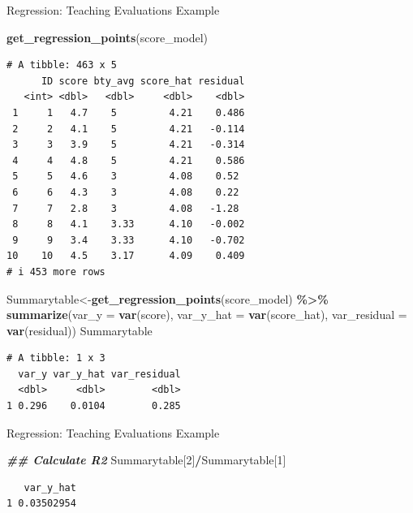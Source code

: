 \documentclass[
  ignorenonframetext,
]{beamer}
\newenvironment{Shaded}{\begin{snugshade}}{\end{snugshade}}
\newcommand{\AttributeTok}[1]{\textcolor[rgb]{0.13,0.29,0.53}{#1}}
\newcommand{\DecValTok}[1]{\textcolor[rgb]{0.00,0.00,0.81}{#1}}
\newcommand{\DocumentationTok}[1]{\textcolor[rgb]{0.56,0.35,0.01}{\textbf{\textit{#1}}}}
\newcommand{\FunctionTok}[1]{\textcolor[rgb]{0.13,0.29,0.53}{\textbf{#1}}}
\newcommand{\NormalTok}[1]{#1}
\newcommand{\OtherTok}[1]{\textcolor[rgb]{0.56,0.35,0.01}{#1}}
\newcommand{\SpecialCharTok}[1]{\textcolor[rgb]{0.81,0.36,0.00}{\textbf{#1}}}
\begin{document}
\begin{frame}[fragile]{Regression: Teaching Evaluations Example}
\protect\hypertarget{regression-teaching-evaluations-example-13}{}
\tiny

\begin{Shaded}
\begin{Highlighting}[]
\FunctionTok{get\_regression\_points}\NormalTok{(score\_model) }
\end{Highlighting}
\end{Shaded}

\begin{verbatim}
# A tibble: 463 x 5
      ID score bty_avg score_hat residual
   <int> <dbl>   <dbl>     <dbl>    <dbl>
 1     1   4.7    5         4.21    0.486
 2     2   4.1    5         4.21   -0.114
 3     3   3.9    5         4.21   -0.314
 4     4   4.8    5         4.21    0.586
 5     5   4.6    3         4.08    0.52 
 6     6   4.3    3         4.08    0.22 
 7     7   2.8    3         4.08   -1.28 
 8     8   4.1    3.33      4.10   -0.002
 9     9   3.4    3.33      4.10   -0.702
10    10   4.5    3.17      4.09    0.409
# i 453 more rows
\end{verbatim}

\begin{Shaded}
\begin{Highlighting}[]
\NormalTok{Summarytable}\OtherTok{\textless{}{-}}\FunctionTok{get\_regression\_points}\NormalTok{(score\_model) }\SpecialCharTok{\%\textgreater{}\%} 
  \FunctionTok{summarize}\NormalTok{(}\AttributeTok{var\_y =} \FunctionTok{var}\NormalTok{(score), }
                      \AttributeTok{var\_y\_hat =} \FunctionTok{var}\NormalTok{(score\_hat), }
                      \AttributeTok{var\_residual =} \FunctionTok{var}\NormalTok{(residual))}
\NormalTok{Summarytable}
\end{Highlighting}
\end{Shaded}

\begin{verbatim}
# A tibble: 1 x 3
  var_y var_y_hat var_residual
  <dbl>     <dbl>        <dbl>
1 0.296    0.0104        0.285
\end{verbatim}

\normalsize
\end{frame}

\begin{frame}[fragile]{Regression: Teaching Evaluations Example}
\protect\hypertarget{regression-teaching-evaluations-example-14}{}
\tiny

\begin{Shaded}
\begin{Highlighting}[]
\DocumentationTok{\#\# Calculate R2}
\NormalTok{Summarytable[}\DecValTok{2}\NormalTok{]}\SpecialCharTok{/}\NormalTok{Summarytable[}\DecValTok{1}\NormalTok{]}
\end{Highlighting}
\end{Shaded}

\begin{verbatim}
   var_y_hat
1 0.03502954
\end{verbatim}

\normalsize
\end{frame}
\end{document}
